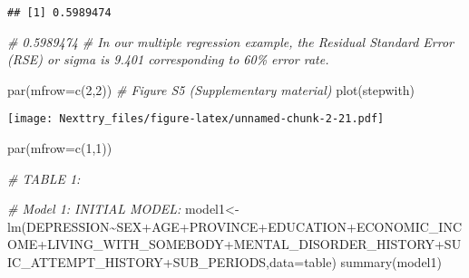 \documentclass[
]{book}
\newenvironment{Shaded}{\begin{snugshade}}{\end{snugshade}}
\newcommand{\AttributeTok}[1]{\textcolor[rgb]{0.77,0.63,0.00}{#1}}
\newcommand{\CommentTok}[1]{\textcolor[rgb]{0.56,0.35,0.01}{\textit{#1}}}
\newcommand{\DecValTok}[1]{\textcolor[rgb]{0.00,0.00,0.81}{#1}}
\newcommand{\FunctionTok}[1]{\textcolor[rgb]{0.00,0.00,0.00}{#1}}
\newcommand{\NormalTok}[1]{#1}
\newcommand{\OtherTok}[1]{\textcolor[rgb]{0.56,0.35,0.01}{#1}}
\newcommand{\SpecialCharTok}[1]{\textcolor[rgb]{0.00,0.00,0.00}{#1}}
\begin{document}
\begin{verbatim}
## [1] 0.5989474
\end{verbatim}

\begin{Shaded}
\begin{Highlighting}[]
\CommentTok{\# 0.5989474}
\CommentTok{\# In our multiple regression example, the Residual Standard Error (RSE) or sigma is 9.401 corresponding to 60\% error rate.}

\FunctionTok{par}\NormalTok{(}\AttributeTok{mfrow=}\FunctionTok{c}\NormalTok{(}\DecValTok{2}\NormalTok{,}\DecValTok{2}\NormalTok{))}
\CommentTok{\# Figure S5 (Supplementary material)}
\FunctionTok{plot}\NormalTok{(stepwith)}
\end{Highlighting}
\end{Shaded}

\texttt{[image: Nexttry\_files/figure-latex/unnamed-chunk-2-21.pdf]}

\begin{Shaded}
\begin{Highlighting}[]
\FunctionTok{par}\NormalTok{(}\AttributeTok{mfrow=}\FunctionTok{c}\NormalTok{(}\DecValTok{1}\NormalTok{,}\DecValTok{1}\NormalTok{))}


\CommentTok{\# TABLE 1:}

\CommentTok{\# Model 1: INITIAL MODEL:}
\NormalTok{model1}\OtherTok{\textless{}{-}}\FunctionTok{lm}\NormalTok{(DEPRESSION}\SpecialCharTok{\textasciitilde{}}\NormalTok{SEX}\SpecialCharTok{+}\NormalTok{AGE}\SpecialCharTok{+}\NormalTok{PROVINCE}\SpecialCharTok{+}\NormalTok{EDUCATION}\SpecialCharTok{+}\NormalTok{ECONOMIC\_INCOME}\SpecialCharTok{+}\NormalTok{LIVING\_WITH\_SOMEBODY}\SpecialCharTok{+}\NormalTok{MENTAL\_DISORDER\_HISTORY}\SpecialCharTok{+}\NormalTok{SUIC\_ATTEMPT\_HISTORY}\SpecialCharTok{+}\NormalTok{SUB\_PERIODS,}\AttributeTok{data=}\NormalTok{table)}
\FunctionTok{summary}\NormalTok{(model1)}
\end{Highlighting}
\end{Shaded}
\end{document}
